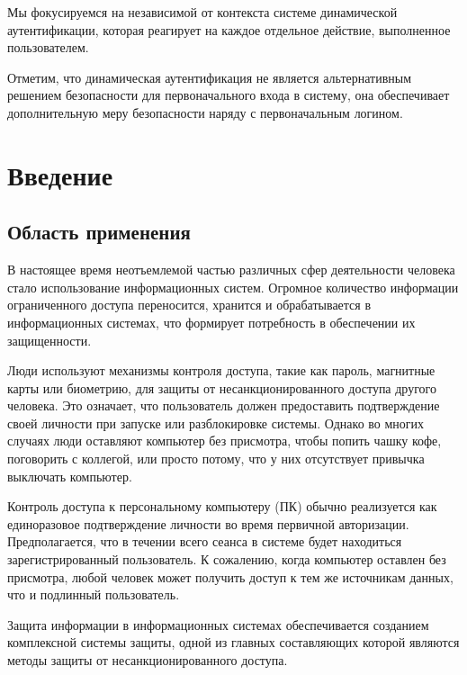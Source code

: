 \documentclass[12pt]{article}
\begin{document}
    \par Мы фокусируемся на независимой от контекста системе динамической аутентификации, которая реагирует на каждое отдельное действие, выполненное пользователем.

    \par Отметим, что динамическая аутентификация не является альтернативным решением безопасности для первоначального входа в систему, она обеспечивает дополнительную меру безопасности наряду с первоначальным логином.

    \newpage



    \section{Введение}
    \label{sec:Intro}

    \subsection{Область применения}
    \label{sec:Intro:ApplicationArea}

    \par В настоящее время неотъемлемой частью различных сфер деятельности человека стало использование информационных систем. Огромное количество информации ограниченного доступа переносится, хранится и обрабатывается в информационных системах, что формирует потребность в обеспечении их защищенности.

    \par Люди используют механизмы контроля доступа, такие как пароль, магнитные карты или биометрию, для защиты от несанкционированного доступа другого человека. Это означает, что пользователь должен предоставить подтверждение своей личности при запуске или разблокировке системы. Однако во многих случаях люди оставляют компьютер без присмотра, чтобы попить чашку кофе, поговорить с коллегой, или просто потому, что у них отсутствует привычка выключать компьютер.

    \par Контроль доступа к персональному компьютеру (ПК) обычно реализуется как единоразовое подтверждение личности во время первичной авторизации. Предполагается, что в течении всего сеанса в системе будет находиться зарегистрированный пользователь. К сожалению, когда компьютер оставлен без присмотра, любой человек может получить доступ к тем же источникам данных, что и подлинный пользователь.

    \par Защита информации в информационных системах обеспечивается созданием комплексной системы защиты, одной из главных составляющих которой являются методы защиты от несанкционированного доступа.
\end{document}
